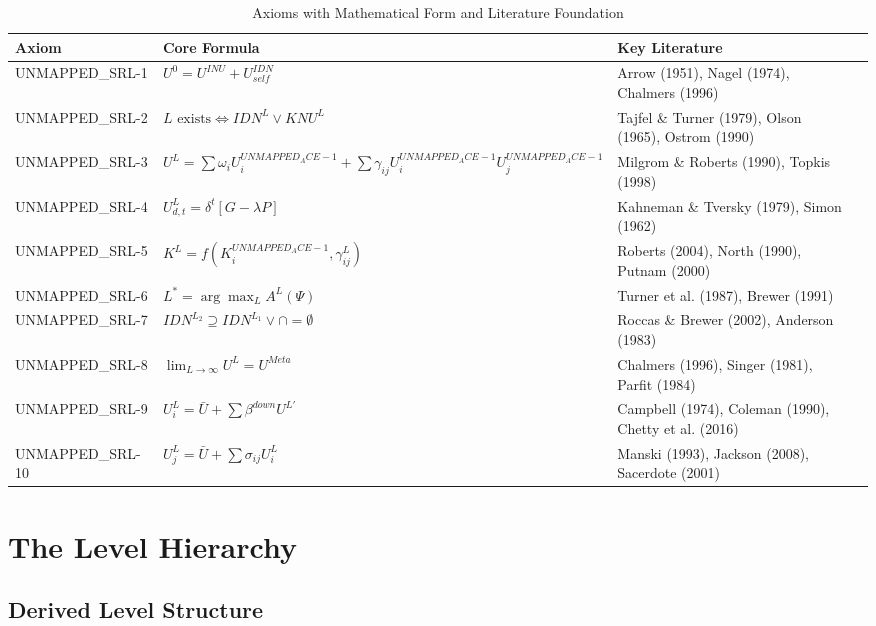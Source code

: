 \begin{table}[htbp]
\centering
\caption{Axioms with Mathematical Form and Literature Foundation}
\label{tab:aaa-axiom-summary}
\renewcommand{\arraystretch}{1.3}
\small
\begin{tabular}{@{}llll@{}}
\toprule
\textbf{Axiom} & \textbf{Core Formula} & \textbf{Key Literature} \\
\midrule
UNMAPPED_SRL-1 & $U^0 = U^{INU} + U^{IDN}_{self}$ & Arrow (1951), Nagel (1974), Chalmers (1996) \\
UNMAPPED_SRL-2 & $L \text{ exists} \iff IDN^L \lor KNU^L$ & Tajfel \& Turner (1979), Olson (1965), Ostrom (1990) \\
UNMAPPED_SRL-3 & $U^L = \sum \omega_i U^{UNMAPPED_ACE-1}_i + \sum \gamma_{ij} U^{UNMAPPED_ACE-1}_i U^{UNMAPPED_ACE-1}_j$ & Milgrom \& Roberts (1990), Topkis (1998) \\
UNMAPPED_SRL-4 & $U^L_{d,t} = \delta^t [G - \lambda P]$ & Kahneman \& Tversky (1979), Simon (1962) \\
UNMAPPED_SRL-5 & $K^L = f(K^{UNMAPPED_ACE-1}_i, \gamma^L_{ij})$ & Roberts (2004), North (1990), Putnam (2000) \\
UNMAPPED_SRL-6 & $L^* = \arg\max_L A^L(\Psi)$ & Turner et al. (1987), Brewer (1991) \\
UNMAPPED_SRL-7 & $IDN^{L_2} \supseteq IDN^{L_1} \lor \cap = \emptyset$ & Roccas \& Brewer (2002), Anderson (1983) \\
UNMAPPED_SRL-8 & $\lim_{L \to \infty} U^L = U^{Meta}$ & Chalmers (1996), Singer (1981), Parfit (1984) \\
UNMAPPED_SRL-9 & $U^L_i = \bar{U} + \sum \beta^{down} U^{L'}$ & Campbell (1974), Coleman (1990), Chetty et al. (2016) \\
UNMAPPED_SRL-10 & $U^L_j = \bar{U} + \sum \sigma_{ij} U^L_i$ & Manski (1993), Jackson (2008), Sacerdote (2001) \\
\bottomrule
\end{tabular}
\end{table}
\section{The Level Hierarchy}
\label{sec:aaa-hierarchy}

\subsection{Derived Level Structure}

